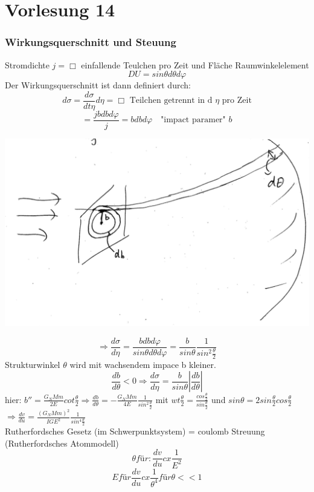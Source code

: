 \documentclass[11pt]{article}
\begin{document}
	\part{Vorlesung 14}
\section{Wirkungsquerschnitt und Steuung}
	Stromdichte $ j = \Box $ einfallende Teulchen pro Zeit und Fläche Raumwinkelelement 
	\[ DU = sin \theta d \theta d \varphi \]
	Der Wirkungsquerschnitt ist dann definiert durch:
	\[ d \sigma = \frac{d \sigma}{dt \eta} d\eta  = \Box \text{ Teilchen getrennt in d $\eta$ pro Zeit} \]
	\[ =\frac{j b d b d \varphi}{j}  = b d b d \varphi \quad \text{"impact paramer" } b \]
	\begin{center}
		\includegraphics[scale=0.5]{winkelquerschnitt.png}
	\end{center}
\[ \Rightarrow \frac{d \sigma }{d \eta} = \frac{b d b d \varphi}{sin \theta d \theta d \varphi}  = \frac{b}{sin \theta} \frac{1}{sin^2 \frac{\theta}{2} }  \]
Strukturwinkel $\theta $ wird mit wachsendem impace b kleiner.
\[ \frac{db}{d\theta} < 0 \Rightarrow \frac{d \sigma }{d \eta}  = \frac{b}{sin \theta} |\frac{db}{d \theta}| \]
hier: $b ''= \frac{G_N Mm}{2E} cot \frac{\theta}{2} \Rightarrow \frac{db}{d\theta} = - \frac{G_N Mm}{4E} \frac{1}{sin^2 \frac{\theta}{2}} $ 
mit $wt \frac{ \theta}{2} = \frac{cos \frac{\theta}{2}}{sin \frac{\theta}{2}} $ und $sin \theta = 2 sin \frac{\theta}{2} cos \frac{\theta}{2} $\\
$\Rightarrow\frac{dv}{du} = \frac{(G_N Mm)^2}{IGE^2} \frac{1}{sin^4 \frac{\theta}{2}}$ \\
Rutherfordsches Gesetz (im Schwerpunktsystem) = coulomb Streuung (Rutherfordsches Atommodell)
\[ \theta für: \frac{dv}{du}  cx  \frac{1}{E^2} \]
\[ E für \frac{dv}{du} cx \frac{1}{\theta^4} für \theta << 1 \]
\end{document}
